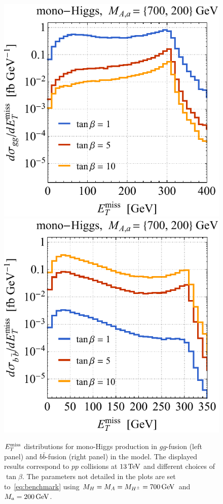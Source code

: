 \begin{figure}[t!]
\centering
\includegraphics[height=0.45\textwidth]{texinputs/04_grid/newfigures/tblh.pdf} \qquad 
\includegraphics[height=0.45\textwidth]{texinputs/04_grid/newfigures/tbrh.pdf}
\vspace{2mm}
\caption{\label{fig:tbvar1} 
$E_T^\mathrm{miss}$ distributions for mono-Higgs production in $gg$-fusion (left panel) and $b \bar b$-fusion (right panel) in the \hdma model. The displayed results correspond to $pp$ collisions at  $13 \, {\rm TeV}$ and different choices of $\tan \beta$. The parameters not detailed in the plots are set to~\eqref{eq:benchmark} using $M_{H} = M_{A} = M_{H^{\pm}} = 700 \, {\rm GeV}$ and $M_{a} = 200 \, {\rm GeV}$.}
\end{figure}

